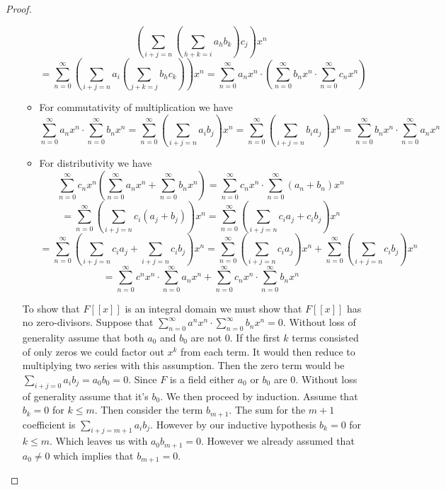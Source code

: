 \documentclass[10pt]{article}
\theoremstyle{plain}
\theoremstyle{remark}
\begin{document}
\begin{proof}
\begin{enumerate}
\begin{itemize}
\[        \left(
          \sum_{i+j=n}
          \left(
            \sum_{h+k=i}a_hb_k
          \right) c_j
        \right)x^n \]\[
        = \sum_{n=0}^\infty 
        \left(
          \sum_{i+j=n}a_i
          \left(
            \sum_{j+k=j} b_hc_k
          \right)
        \right)x^n
        =
        \sum_{n=0}^\infty a_nx^n\cdot 
        \left(
          \sum_{n=0}^\infty b_nx^n\cdot \sum_{n=0}^\infty c_nx^n
        \right)
      \]
    \item For commutativity of multiplication we have
      \[ \sum_{n=0}^\infty a_nx^n\cdot\sum_{n=0}^\infty b_nx^n=\sum_{n=0}^\infty 
        \left(
          \sum_{i+j=n}a_ib_j
        \right)x^n
        =\sum_{n=0}^\infty 
        \left(
          \sum_{i+j=n}b_ia_j
        \right)x^n
        = \sum_{n=0}^\infty b_nx^n\cdot \sum_{n=0}^\infty a_nx^n\]
    \item For distributivity we have
      \[ \sum_{n=0}^\infty c_nx^n
        \left(
          \sum_{n=0}^\infty a_nx^n+\sum_{n=0}^\infty b_nx^n
        \right)
        =
        \sum_{n=0}^\infty c_nx^n\cdot \sum_{n=0}^\infty (a_n+b_n)x^n \]\[
        =
        \sum_{n=0}^\infty 
        \left(
          \sum_{i+j=n}c_i(a_j+b_j)
        \right)x^n
        =
        \sum_{n=0}^\infty 
        \left(
          \sum_{i+j=n}c_ia_j+c_ib_j
        \right)x^n \]\[
        =
        \sum_{n=0}^\infty 
        \left(
          \sum_{i+j=n}c_ia_j+\sum_{i+j=n}c_ib_j
        \right)x^n
        =
        \sum_{n=0}^\infty
        \left(
          \sum_{i+j=n}c_ia_j
        \right)x^n
        +
        \sum_{n=0}^\infty
        \left(
          \sum_{i+j=n}c_ib_j
        \right)x^n \]\[
        =
        \sum_{n=0}^\infty c^nx^n\cdot\sum_{n=0}^\infty a_nx^n+\sum_{n=0}^\infty c_nx^n\cdot\sum_{n=0}^\infty b_nx^n
      \]
    \end{itemize}

    To show that $F[[x]]$ is an integral domain we must show that
    $F[[x]]$ has no zero-divisors. Suppose that $\sum_{n=0}^\infty a^nx^n\cdot\sum_{n=0}^\infty b_nx^n=0$.
    Without loss of generality assume that both $a_0$ and $b_0$ are not $0$.
    If the first $k$ terms consisted of only zeros we could factor out $x^{k}$ from
    each term. It would then reduce to multiplying two series with this assumption.
    Then the zero term would
    be $\sum_{i+j=0}a_ib_j=a_0b_0=0$. Since $F$ is a field either $a_0$ or $b_0$ are $0$.
    Without loss of generality assume that it's $b_0$. We then proceed by induction.
    Assume that $b_k=0$ for $k\leq m$. Then consider the term $b_{m+1}$. The sum
    for the $m+1$ coefficient is $\sum_{i+j=m+1}a_ib_j$. However by our inductive
    hypothesis $b_k=0$ for $k\leq m$. Which leaves us with $a_0b_{m+1}=0$. However
    we already assumed that $a_0\neq 0$ which implies that $b_{m+1}=0$.


\end{enumerate}
\end{proof}
\end{document}
